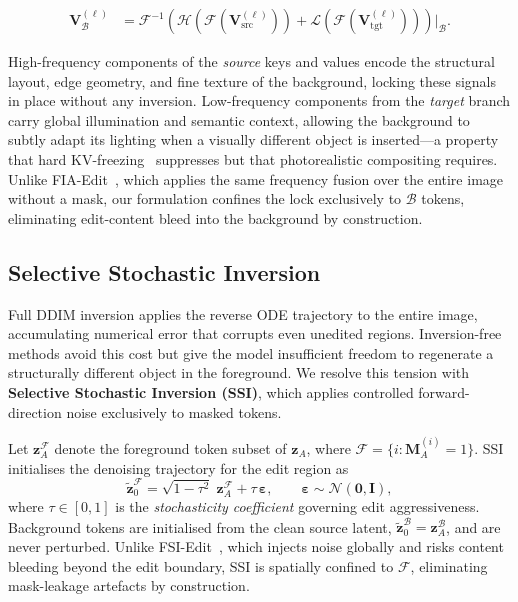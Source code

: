 \begin{equation}
\begin{aligned}
    \mathbf{V}_{\mathcal{B}}^{(\ell)}
        &= \mathcal{F}^{-1}\!\left(
              \mathcal{H}\!\left(\mathcal{F}\!\left(\mathbf{V}_{\text{src}}^{(\ell)}\right)\right)
            + \mathcal{L}\!\left(\mathcal{F}\!\left(\mathbf{V}_{\text{tgt}}^{(\ell)}\right)\right)
           \right)\!\bigg|_{\mathcal{B}}.
\end{aligned}
\label{eq:bg_V}
\end{equation}


High-frequency components of the \emph{source} keys and values encode the structural layout,
edge geometry, and fine texture of the background, locking these signals in place without any
inversion.
Low-frequency components from the \emph{target} branch carry global illumination and semantic
context, allowing the background to subtly adapt its lighting when a visually different object
is inserted---a property that hard KV-freezing~\citep{Zhu2025KVEdit} suppresses but that
photorealistic compositing requires.
Unlike FIA-Edit~\citep{FIAEdit2024}, which applies the same frequency fusion over the entire
image without a mask, our formulation confines the lock exclusively to $\mathcal{B}$ tokens,
eliminating edit-content bleed into the background by construction.

\subsection{Selective Stochastic Inversion}

Full DDIM inversion applies the reverse ODE trajectory to the entire image, accumulating
numerical error that corrupts even unedited regions.
Inversion-free methods avoid this cost but give the model insufficient freedom to regenerate
a structurally different object in the foreground.
We resolve this tension with \textbf{Selective Stochastic Inversion (SSI)}, which applies
controlled forward-direction noise exclusively to masked tokens.

Let $\mathbf{z}_A^{\mathcal{F}}$ denote the foreground token subset of $\mathbf{z}_A$,
where $\mathcal{F} = \{i : \mathbf{M}_A^{(i)} = 1\}$.
SSI initialises the denoising trajectory for the edit region as
\begin{equation}
    \tilde{\mathbf{z}}_0^{\mathcal{F}}
        = \sqrt{1-\tau^2}\;\mathbf{z}_A^{\mathcal{F}} + \tau\,\boldsymbol{\varepsilon},
    \qquad \boldsymbol{\varepsilon} \sim \mathcal{N}(\mathbf{0}, \mathbf{I}),
    \label{eq:ssi}
\end{equation}
where $\tau \in [0, 1]$ is the \emph{stochasticity coefficient} governing edit aggressiveness.
Background tokens are initialised from the clean source latent,
$\tilde{\mathbf{z}}_0^{\mathcal{B}} = \mathbf{z}_A^{\mathcal{B}}$, and are never perturbed.
Unlike FSI-Edit~\citep{FSIEdit2025}, which injects noise globally and risks content bleeding
beyond the edit boundary, SSI is spatially confined to $\mathcal{F}$, eliminating
mask-leakage artefacts by construction.

